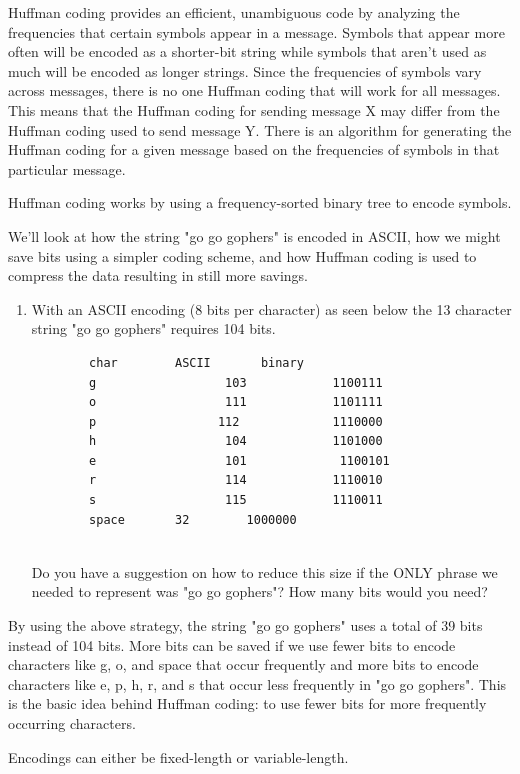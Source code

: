 \documentclass[11pt]{article}
\begin{document}
Huffman coding provides an efficient, unambiguous code by analyzing the frequencies that certain symbols appear in a message. Symbols that appear more often will be encoded as a shorter-bit string while symbols that aren't used as much will be encoded as longer strings. Since the frequencies of symbols vary across messages, there is no one Huffman coding that will work for all messages. This means that the Huffman coding for sending message X may differ from the Huffman coding used to send message Y. There is an algorithm for generating the Huffman coding for a given message based on the frequencies of symbols in that particular message.

Huffman coding works by using a frequency-sorted binary tree to encode symbols.

We'll look at how the string "go go gophers" is encoded in ASCII, how we might save bits using a simpler coding scheme, and how Huffman coding is used to compress the data resulting in still more savings.

\begin{enumerate}
	\item With an ASCII encoding (8 bits per character) as seen below the 13 character string "go go gophers" requires 104 bits. 
	\begin{verbatim}
		char		ASCII		binary
		g				   103			  1100111
		o				   111			  1101111
		p				  112			  1110000
		h				   104			  1101000
		e				   101			   1100101
		r				   114			  1110010
		s				   115			  1110011
		space		32		  1000000
		
	\end{verbatim}
Do you have a suggestion on how to reduce this size if the ONLY phrase we needed to represent was "go go gophers"? How many bits would you need?
\end{enumerate}

By using the above strategy, the string "go go gophers" uses a total of 39 bits instead of 104 bits. More bits can be saved if we use fewer bits to encode characters like g, o, and space that occur frequently and more bits to encode characters like e, p, h, r, and s that occur less frequently in "go go gophers". This is the basic idea behind Huffman coding: to use fewer bits for more frequently occurring characters. 

Encodings can either be fixed-length or variable-length.
\end{document}
